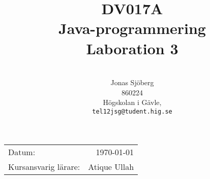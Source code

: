 \documentclass[11pt,a4paper]{article}
\title{DV017A \\ Java-programmering \\ Laboration 3}
\author{\\
  Jonas Sjöberg\\
  860224\\
  Högskolan i Gävle,\\
  \texttt{tel12jsg@tudent.hig.se}
}
\date{}
\begin{document}
    \maketitle

    \begin{center}
    \begin{tabular}{l r}
        Datum: & \today \par \\
        Kursansvarig lärare: & Atique Ullah
    \end{tabular}
    \end{center}

    \begin{abstract}
    \end{abstract}

    \newpage
    \setcounter{tocdepth}{3}
    \tableofcontents
    \newpage

    
    
    
    
\end{document}
